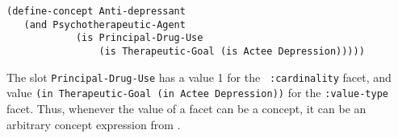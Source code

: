 \begin{verbatim}
(define-concept Anti-depressant
   (and Psychotherapeutic-Agent
            (is Principal-Drug-Use 
                (is Therapeutic-Goal (is Actee Depression)))))
\end{verbatim}

The slot {\tt Principal-Drug-Use} has a value 1 for the {\tt
:cardinality} facet, and value {\tt (in Therapeutic-Goal (in Actee
Depression))} for the {\tt :value-type} facet.  Thus, whenever the value of a
facet can be a concept, it can be an arbitrary concept expression from
\KRSS. 



